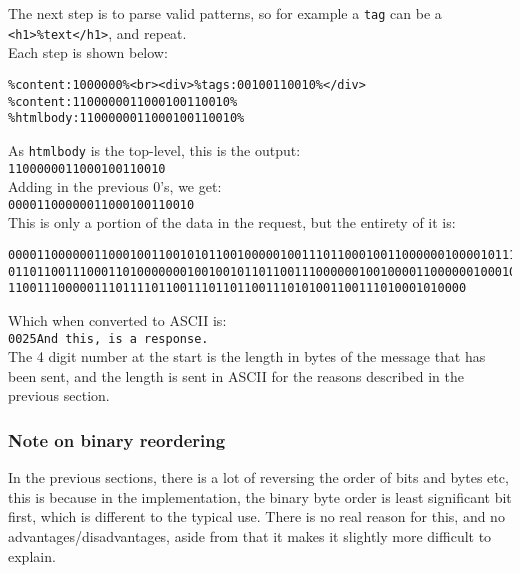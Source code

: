 The next step is to parse valid patterns, so for example a \texttt{tag} can be a \texttt{<h1>\%text</h1>}, and repeat.\\
Each step is shown below:
\begin{lstlisting}[numbers=none]
%content:1000000%<br><div><span>%tags:00110010%</span></div>
%content:1000000%<br><div>%tags:00100110010%</div>
%content:1100000011000100110010%
%htmlbody:1100000011000100110010%
\end{lstlisting}
As \texttt{htmlbody} is the top-level, this is the output:\\
\texttt{1100000011000100110010}\\
Adding in the previous 0's, we get:\\
\texttt{00001100000011000100110010}\\
This is only a portion of the data in the request, but the entirety of it is:
\begin{lstlisting}[numbers=none,breaklines=true,breakatwhitespace=false]
000011000000110001001100101011001000001001110110001001100000010000101110000101101001
011011001110001101000000010010010110110011100000010010000110000001000100111010100110
1100111000001110111101100111011011001110101001100111010001010000
\end{lstlisting}
Which when converted to ASCII is:\\
\texttt{0025And this, is a response.}\\
The 4 digit number at the start is the length in bytes of the message that has been sent, and the length is sent in ASCII for the reasons described in the previous section.

\subsubsection{Note on binary reordering}
In the previous sections, there is a lot of reversing the order of bits and bytes etc, this is because in the implementation, the binary byte order is least significant bit first, which is different to the typical use. There is no real reason for this, and no advantages/disadvantages, aside from that it makes it slightly more difficult to explain.
